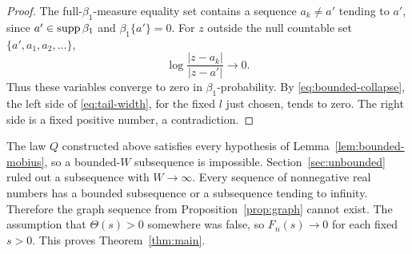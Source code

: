 \begin{proof}
The full-$\beta_1$-measure equality set contains a sequence
$a_k\ne a'$ tending to $a'$, since $a'\in\operatorname{supp}\beta_1$ and
$\beta_1\{a'\}=0$.  For $z$ outside the null countable set
$\{a',a_1,a_2,\ldots\}$,
\[
 \log\frac{|z-a_k|}{|z-a'|}\longrightarrow0.
\]
Thus these variables converge to zero in $\beta_1$-probability.
By \eqref{eq:bounded-collapse}, the left side of
\eqref{eq:tail-width}, for the fixed $l$ just chosen, tends to zero.
The right side is a fixed positive number, a contradiction.
\end{proof}

The law $Q$ constructed above satisfies every hypothesis of
Lemma~\ref{lem:bounded-mobius}, so a bounded-$W$ subsequence is impossible.
Section~\ref{sec:unbounded} ruled out a subsequence with $W\to\infty$.
Every sequence of nonnegative real numbers has a bounded subsequence
or a subsequence tending to infinity.  Therefore the graph sequence
from Proposition~\ref{prop:graph} cannot exist.  The assumption that
$\Theta(s)>0$ somewhere was false, so $F_n(s)\to0$ for each fixed
$s>0$.  This proves Theorem~\ref{thm:main}.
